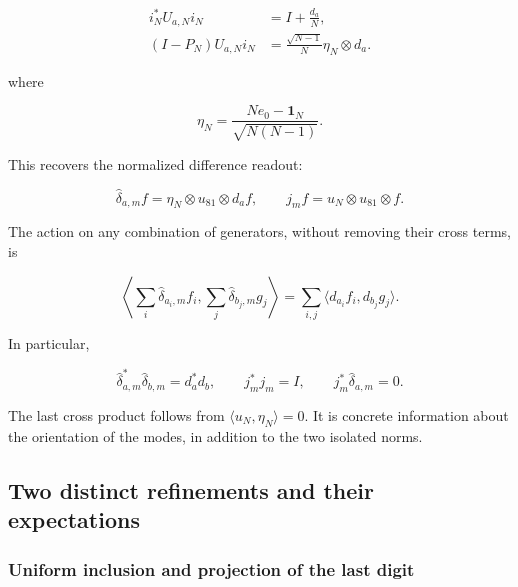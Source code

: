 \begin{equation}
\begin{aligned}
i_N^*U_{a,N}i_N&=I+\frac{d_a}{N},\\
(I-P_N)U_{a,N}i_N
&=\frac{\sqrt{N-1}}{N}\eta_N\otimes d_a.
\end{aligned}
\label{gamma-add-display-3}
\end{equation}

where

\begin{equation}
\eta_N=\frac{Ne_0-\mathbf1_N}{\sqrt{N(N-1)}}.
\label{gamma-add-display-4}
\end{equation}

This recovers the normalized difference readout:

\begin{equation}
\widehat\delta_{a,m}f=\eta_N\otimes u_{81}\otimes d_af,
\qquad
j_mf=u_N\otimes u_{81}\otimes f.
\label{gamma-add-display-5}
\end{equation}

The action on any combination of generators, without removing their cross terms, is

\begin{equation}
\left\langle\sum_i\widehat\delta_{a_i,m}f_i,
                  \sum_j\widehat\delta_{b_j,m}g_j\right\rangle
=\sum_{i,j}\langle d_{a_i}f_i,d_{b_j}g_j\rangle.
\label{gamma-add-display-6}
\end{equation}

In particular,

\begin{equation}
\widehat\delta_{a,m}^*\widehat\delta_{b,m}=d_a^*d_b,\qquad
j_m^*j_m=I,\qquad
j_m^*\widehat\delta_{a,m}=0.
\label{gamma-add-eq-1}
\end{equation}

The last cross product follows from \(\langle u_N,\eta_N\rangle=0\). It is concrete information about the orientation of the modes, in addition to the two isolated norms.

\subsection{Two distinct refinements and their expectations}
\label{gamma-add-sub-108}

\subsubsection{Uniform inclusion and projection of the last digit}
\label{gamma-add-sub-110}

